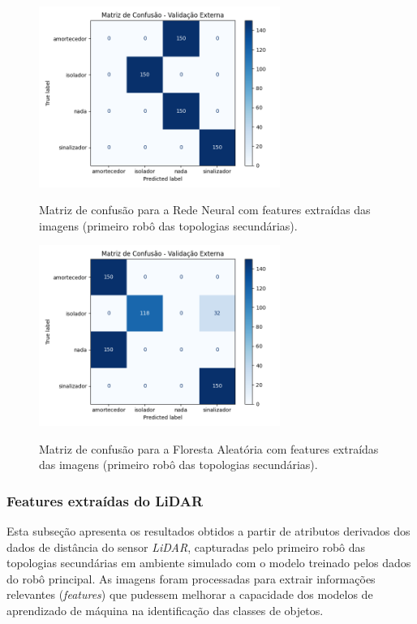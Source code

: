 \begin{figure}[H]
\centering
\caption{Matriz de confusão para a Rede Neural com features extraídas das imagens (primeiro robô das topologias secundárias).}
\includegraphics[width=0.7\textwidth]{figuras/Resultados/multi_primeiro_Teste3_nn.png}
\label{fig:mc_featimg_nn_robo1_t3}
\fonte{}
\end{figure}

\begin{figure}[H]
\centering
\caption{Matriz de confusão para a Floresta Aleatória com features extraídas das imagens (primeiro robô das topologias secundárias).}
\includegraphics[width=0.7\textwidth]{figuras/Resultados/multi_primeiro_Teste3_rf.png}
\label{fig:mc_featimg_rf_robo1_t3}
\fonte{}
\end{figure}

\subsubsection{Features extraídas do LiDAR}

Esta subseção apresenta os resultados obtidos a partir de atributos derivados dos dados de distância do sensor \textit{LiDAR}, capturadas pelo primeiro robô das topologias secundárias em ambiente simulado com o modelo treinado pelos dados do robô principal. As imagens foram processadas para extrair informações relevantes (\textit{features}) que pudessem melhorar a capacidade dos modelos de aprendizado de máquina na identificação das classes de objetos.

